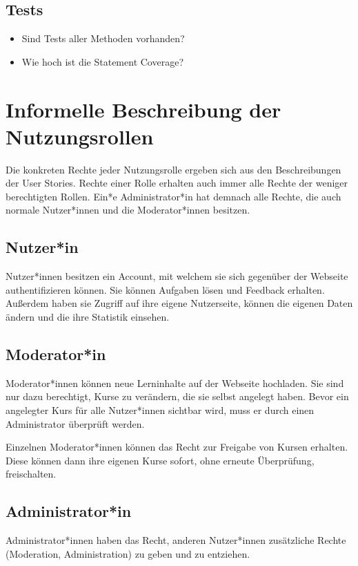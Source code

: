 \documentclass[accentcolor=tud0b,12pt,paper=a4]{tudreport}
\begin{document}
\begin{multicols}{2}
	\subsection{Tests}
	\begin{itemize}
		\item Sind Tests aller Methoden vorhanden?
		\item Wie hoch ist die Statement Coverage?
	\end{itemize}
\end{multicols}

\section{Informelle Beschreibung der Nutzungsrollen}
Die konkreten Rechte jeder Nutzungsrolle ergeben sich aus den Beschreibungen der User Stories. Rechte einer Rolle erhalten auch immer alle Rechte der weniger berechtigten Rollen. Ein*e Administrator*in hat demnach alle Rechte, die auch normale Nutzer*innen und die Moderator*innen besitzen.

\subsection{Nutzer*in}
Nutzer*innen besitzen ein Account, mit welchem sie sich gegenüber der Webseite authentifizieren können. Sie können Aufgaben lösen und Feedback erhalten. Außerdem haben sie Zugriff auf ihre eigene Nutzerseite, können die eigenen Daten ändern und die ihre Statistik einsehen.

\subsection{Moderator*in}
Moderator*innen können neue Lerninhalte auf der Webseite hochladen. Sie sind nur dazu berechtigt, Kurse zu verändern, die sie selbst angelegt haben. Bevor ein angelegter Kurs für alle Nutzer*innen sichtbar wird, muss er durch einen Administrator überprüft werden.

Einzelnen Moderator*innen können das Recht zur Freigabe von Kursen erhalten. Diese können dann ihre eigenen Kurse sofort, ohne erneute Überprüfung, freischalten.

\subsection{Administrator*in}
Administrator*innen haben das Recht, anderen Nutzer*innen zusätzliche Rechte (Moderation, Administration) zu geben und zu entziehen.
\end{document}
